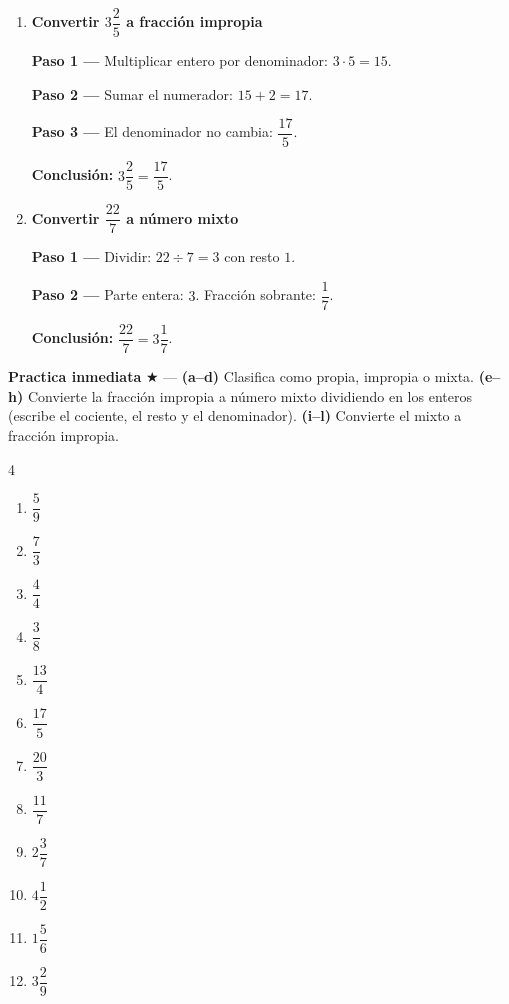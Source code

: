 \documentclass[11pt, letterpaper]{article}
\begin{document}
\begin{tcolorbox}[examplebox, title={Ejemplos --- convertir entre formas}]
\begin{enumerate}[label=\textbf{Ej. \arabic*.}, leftmargin=*, itemsep=12pt]

\item \textbf{Convertir $3\dfrac{2}{5}$ a fracci\'on impropia}

\textbf{Paso 1 ---} Multiplicar entero por denominador: $3 \cdot 5 = 15$.

\textbf{Paso 2 ---} Sumar el numerador: $15 + 2 = 17$.

\textbf{Paso 3 ---} El denominador no cambia: $\dfrac{17}{5}$.

\textbf{Conclusi\'on:} $3\dfrac{2}{5} = \dfrac{17}{5}$. \checkmark

\item \textbf{Convertir $\dfrac{22}{7}$ a n\'umero mixto}

\textbf{Paso 1 ---} Dividir: $22 \div 7 = 3$ con resto $1$.

\textbf{Paso 2 ---} Parte entera: $3$. Fracci\'on sobrante: $\dfrac{1}{7}$.

\textbf{Conclusi\'on:} $\dfrac{22}{7} = 3\dfrac{1}{7}$. \checkmark

\end{enumerate}
\end{tcolorbox}

\medskip
\textbf{Practica inmediata} \quad $\bigstar$ ---
\textbf{(a–d)} Clasifica como propia, impropia o mixta. \textbf{(e–h)} Convierte la fracci\'on impropia a n\'umero mixto dividiendo en los enteros (escribe el cociente, el resto y el denominador). \textbf{(i–l)} Convierte el mixto a fracci\'on impropia.
\begin{multicols}{4}
\begin{enumerate}[label=\alph*), leftmargin=*]
  \item $\dfrac{5}{9}$
  \item $\dfrac{7}{3}$
  \item $\dfrac{4}{4}$
  \item $\dfrac{3}{8}$
  \item $\dfrac{13}{4}$
  \item $\dfrac{17}{5}$
  \item $\dfrac{20}{3}$
  \item $\dfrac{11}{7}$
  \item $2\dfrac{3}{7}$
  \item $4\dfrac{1}{2}$
  \item $1\dfrac{5}{6}$
  \item $3\dfrac{2}{9}$
\end{enumerate}
\end{multicols}
\end{document}
